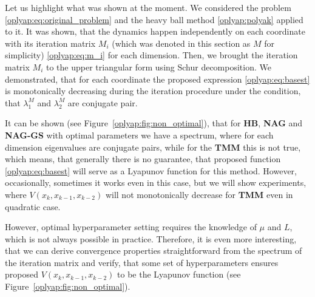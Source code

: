 \documentclass[a4paper,11pt]{article}
\begin{document}
Let us highlight what was shown at the moment. We considered the problem \eqref{oplyap:eq:original_problem} and the heavy ball method \eqref{oplyap:polyak} applied to it. It was shown, that the dynamics happen independently on each coordinate with its iteration matrix $M_i$ (which was denoted in this section as $M$ for simplicity) \eqref{oplyap:eq:m_i} for each dimension. Then, we brought the iteration matrix $M_i$ to the upper triangular form using Schur decomposition. We demonstrated, that for each coordinate the proposed expression \eqref{oplyap:eq:basest} is monotonically decreasing during the iteration procedure under the condition, that $\lambda_1^M$ and $\lambda_2^M$ are conjugate pair. 

It can be shown (see Figure~\ref{oplyap:fig:non_optimal}), that for \textbf{HB}, \textbf{NAG} and \textbf{NAG-GS} with optimal parameters we have a spectrum, where for each dimension eigenvalues are conjugate pairs, while for the \textbf{TMM} this is not true, which means, that generally there is no guarantee, that proposed function \eqref{oplyap:eq:basest} will serve as a Lyapunov function for this method. However, occasionally, sometimes it works even in this case, but we will show experiments, where $V(x_k, x_{k-1}, x_{k-2})$ will not monotonically decrease for \textbf{TMM} even in quadratic case.

However, optimal hyperparameter setting requires the knowledge of $\mu$ and $L$, which is not always possible in practice. Therefore, it is even more interesting, that we can derive convergence properties straightforward from the spectrum of the iteration matrix and verify, that some set of hyperparameters ensures proposed $V(x_k, x_{k-1}, x_{k-2})$ to be the Lyapunov function (see Figure~\ref{oplyap:fig:non_optimal}).
\end{document}

